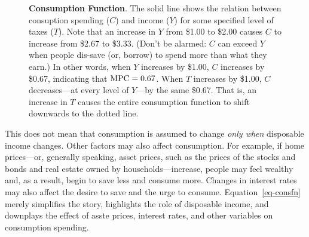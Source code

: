\documentclass[
  letterpaper,
]{book}
\theoremstyle{plain}
\theoremstyle{remark}
\begin{document}
\begin{figure}


\caption{\label{fig-consumption_function}\textbf{Consumption Function}.
The solid line shows the relation between consuption spending (\(C\))
and income (\(Y\)) for some specified level of taxes (\(T\)). Note that
an increase in \(Y\) from \$1.00 to \$2.00 causes \(C\) to increase from
\$2.67 to \$3.33. (Don't be alarmed: \(C\) can exceed \(Y\) when people
dis-save (or, borrow) to spend more than what they earn.) In other
words, when \(Y\) increases by \$1.00, \(C\) increases by \$0.67,
indicating that \(\hbox{MPC}=0.67\). When \(T\) increases by \$1.00,
\(C\) decreases---at every level of \(Y\)---by the same \$0.67. That is,
an increase in \(T\) causes the entire consumption function to shift
downwards to the dotted line.}

\end{figure}%

This does not mean that consumption is assumed to change \emph{only
when} disposable income changes. Other factors may also affect
consumption. For example, if home prices---or, generally speaking, asset
prices, such as the prices of the stocks and bonds and real estate owned
by households---increase, people may feel wealthy and, as a result,
begin to save less and consume more. Changes in interest rates may also
affect the desire to save and the urge to consume.
Equation~\ref{eq-consfn} merely simplifies the story, highlights the
role of disposable income, and downplays the effect of asste prices,
interest rates, and other variables on consumption spending.
\end{document}
